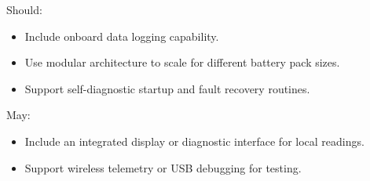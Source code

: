 Should:
\begin{itemize}
	\item Include onboard data logging capability.
	\item Use modular architecture to scale for different battery pack sizes.
	\item Support self-diagnostic startup and fault recovery routines.
\end{itemize}

May:
\begin{itemize}
	\item Include an integrated display or diagnostic interface for local readings.
	\item Support wireless telemetry or USB debugging for testing.
\end{itemize}